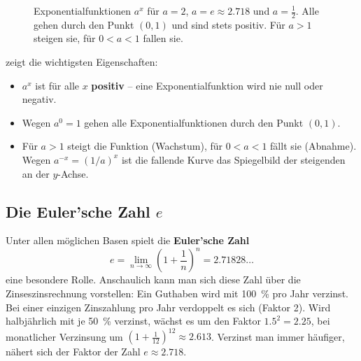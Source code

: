 \begin{figure}[htb]
    \centering
    \caption{Exponentialfunktionen $a^x$ für $a = 2$, $a = e \approx \num{2.718}$ und $a = \frac{1}{2}$. Alle gehen durch den Punkt $(0,1)$ und sind stets positiv. Für $a > 1$ steigen sie, für $0 < a < 1$ fallen sie.}\label{fig: exponentialfunktionen}
\end{figure}

 zeigt die wichtigsten Eigenschaften:
\begin{itemize}[itemsep=1.5pt]
    \item $a^x$ ist für alle $x$ \textbf{positiv} -- eine Exponentialfunktion wird nie null oder negativ.
    \item Wegen $a^0 = 1$ gehen alle Exponentialfunktionen durch den Punkt $(0,1)$.
    \item Für $a > 1$ steigt die Funktion (Wachstum), für $0 < a < 1$ fällt sie (Abnahme). Wegen $a^{-x} = (1/a)^x$ ist die fallende Kurve das Spiegelbild der steigenden an der $y$-Achse.
\end{itemize}

\subsection{Die Euler'sche Zahl $e$}
Unter allen möglichen Basen spielt die \textbf{Euler'sche Zahl}
\begin{equation}\label{eq: eulersche_zahl}
    e = \lim_{n \to \infty} \left(1 + \frac{1}{n}\right)^n = \num{2.71828}\ldots
\end{equation}
eine besondere Rolle. Anschaulich kann man sich diese Zahl über die Zinseszinsrechnung vorstellen: Ein Guthaben wird mit \SI{100}{\percent} pro Jahr verzinst. Bei einer einzigen Zinszahlung pro Jahr verdoppelt es sich (Faktor 2). Wird halbjährlich mit je \SI{50}{\percent} verzinst, wächst es um den Faktor $\num{1.5}^2 = \num{2.25}$, bei monatlicher Verzinsung um $\left(1 + \frac{1}{12}\right)^{12} \approx \num{2.613}$. Verzinst man immer häufiger, nähert sich der Faktor der Zahl $e \approx \num{2.718}$.

